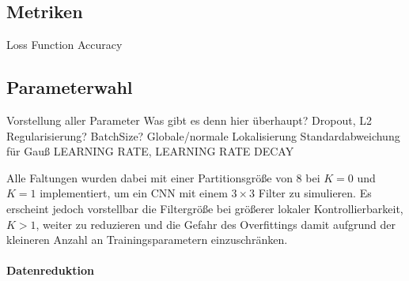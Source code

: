 \begin{table}[t]
\centering
{}
\caption[Superpixelparameter für den \gls{Pascal} Datensatz]{Wahl der Superpixelparameter für den \gls{Pascal} Datensatz}
\label{tab:pascal_voc}
\end{table}



\subsection{Metriken}
\label{metriken}

Loss Function
Accuracy

\subsection{Parameterwahl}
\label{parameterwahl}

Vorstellung aller Parameter
Was gibt es denn hier überhaupt?
Dropout, L2 Regularisierung?
BatchSize?
Globale/normale Lokalisierung
Standardabweichung für Gauß
LEARNING RATE, LEARNING RATE DECAY

Alle Faltungen wurden dabei mit einer Partitionsgröße von $8$ bei $K=0$ und $K=1$ implementiert, um ein \gls{CNN} mit einem $3 \times 3$ Filter zu simulieren.
Es erscheint jedoch vorstellbar die Filtergröße bei größerer lokaler Kontrollierbarkeit, \dhe{} $K > 1$, weiter zu reduzieren und die Gefahr des Overfittings damit aufgrund der kleineren Anzahl an Trainingsparametern einzuschränken.

\paragraph{Datenreduktion}
\label{datenreduktion}

